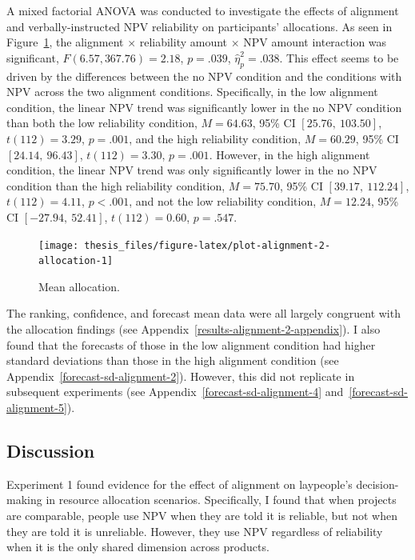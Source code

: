 \documentclass[a4paper, nobind, dvipsnames]{templates/ociamthesis}
\theoremstyle{definition}
\theoremstyle{definition}
\theoremstyle{definition}
\theoremstyle{definition}
\theoremstyle{remark}
\begin{document}
A mixed factorial ANOVA was conducted to investigate the effects of alignment
and verbally-instructed NPV reliability on participants' allocations. As seen in
Figure~\ref{fig:plot-alignment-2-allocation}, the alignment \(\times\)
reliability amount \(\times\) NPV amount interaction was significant,
\(F(6.57, 367.76) = 2.18\), \(p = .039\), \(\hat{\eta}^2_p = .038\). This
effect seems to be driven by the differences between the no NPV condition and
the conditions with NPV across the two alignment conditions. Specifically, in
the low alignment condition, the linear NPV trend was significantly lower in the
no NPV condition than both the low reliability condition,
\(M = 64.63\), 95\% CI \([25.76,~103.50]\), \(t(112) = 3.29\), \(p = .001\), and the high
reliability condition, \(M = 60.29\), 95\% CI \([24.14,~96.43]\), \(t(112) = 3.30\), \(p = .001\).
However, in the high alignment condition, the linear NPV trend was only
significantly lower in the no NPV condition than the high reliability condition,
\(M = 75.70\), 95\% CI \([39.17,~112.24]\), \(t(112) = 4.11\), \(p < .001\), and not the low
reliability condition, \(M = 12.24\), 95\% CI \([-27.94,~52.41]\), \(t(112) = 0.60\), \(p = .547\).



\begin{figure}
\texttt{[image: thesis\_files/figure-latex/plot-alignment-2-allocation-1]} \caption{Mean allocation.}\label{fig:plot-alignment-2-allocation}
\end{figure}

The ranking, confidence, and forecast mean data were all largely congruent with
the allocation findings (see Appendix~\ref{results-alignment-2-appendix}). I
also found that the forecasts of those in the low alignment condition had higher
standard deviations than those in the high alignment condition (see
Appendix~\ref{forecast-sd-alignment-2}). However, this did not replicate in
subsequent experiments (see Appendix~\ref{forecast-sd-alignment-4}
and~\ref{forecast-sd-alignment-5}).

\hypertarget{discussion-1}{%
\subsection{Discussion}\label{discussion-1}}

Experiment 1 found evidence for the effect of alignment on laypeople's
decision-making in resource allocation scenarios. Specifically, I found that
when projects are comparable, people use NPV when they are told it is reliable,
but not when they are told it is unreliable. However, they use NPV regardless of
reliability when it is the only shared dimension across products.
\end{document}

